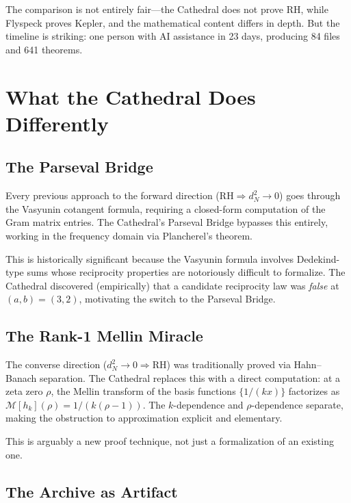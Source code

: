 \documentclass[11pt,a4paper]{article}
\newcommand{\RH}{\ensuremath{\mathrm{RH}}}
\begin{document}
The comparison is not entirely fair---the Cathedral does not prove
RH, while Flyspeck proves Kepler, and the mathematical content
differs in depth. But the timeline is striking: one person with AI
assistance in 23 days, producing 84 files and 641 theorems.

\section{What the Cathedral Does Differently}

\subsection{The Parseval Bridge}

Every previous approach to the forward direction
($\RH \Rightarrow d_N^2 \to 0$) goes through the Vasyunin
cotangent formula, requiring a closed-form computation of the
Gram matrix entries. The Cathedral's Parseval Bridge bypasses this
entirely, working in the frequency domain via Plancherel's theorem.

This is historically significant because the Vasyunin formula
involves Dedekind-type sums whose reciprocity properties are
notoriously difficult to formalize. The Cathedral discovered
(empirically) that a candidate reciprocity law was \emph{false}
at $(a,b) = (3,2)$, motivating the switch to the Parseval Bridge.

\subsection{The Rank-1 Mellin Miracle}

The converse direction ($d_N^2 \to 0 \Rightarrow \RH$) was
traditionally proved via Hahn--Banach separation. The Cathedral
replaces this with a direct computation: at a zeta zero $\rho$,
the Mellin transform of the basis functions $\{1/(kx)\}$
factorizes as $\mathcal{M}[h_k](\rho) = 1/(k(\rho-1))$. The
$k$-dependence and $\rho$-dependence separate, making the
obstruction to approximation explicit and elementary.

This is arguably a new proof technique, not just a formalization
of an existing one.

\subsection{The Archive as Artifact}
\end{document}
